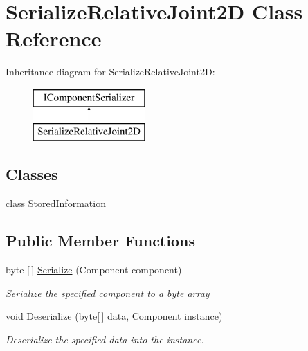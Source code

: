 \hypertarget{class_serialize_relative_joint2_d}{}\section{Serialize\+Relative\+Joint2D Class Reference}
\label{class_serialize_relative_joint2_d}
Inheritance diagram for Serialize\+Relative\+Joint2D\+:\begin{figure}[H]
\begin{center}
\leavevmode
\includegraphics[height=2.000000cm]{class_serialize_relative_joint2_d}
\end{center}
\end{figure}
\subsection*{Classes}
\begin{DoxyCompactItemize}
\item 
class \hyperlink{class_serialize_relative_joint2_d_1_1_stored_information}{Stored\+Information}
\end{DoxyCompactItemize}
\subsection*{Public Member Functions}
\begin{DoxyCompactItemize}
\item 
byte \mbox{[}$\,$\mbox{]} \hyperlink{class_serialize_relative_joint2_d_a4769d5255430ffa12107acdc03a2e73a}{Serialize} (Component component)
\begin{DoxyCompactList}\small\item\em Serialize the specified component to a byte array \end{DoxyCompactList}\item 
void \hyperlink{class_serialize_relative_joint2_d_a48e35c8c7fa333d24579df5f00128a50}{Deserialize} (byte\mbox{[}$\,$\mbox{]} data, Component instance)
\begin{DoxyCompactList}\small\item\em Deserialize the specified data into the instance. \end{DoxyCompactList}\end{DoxyCompactItemize}



